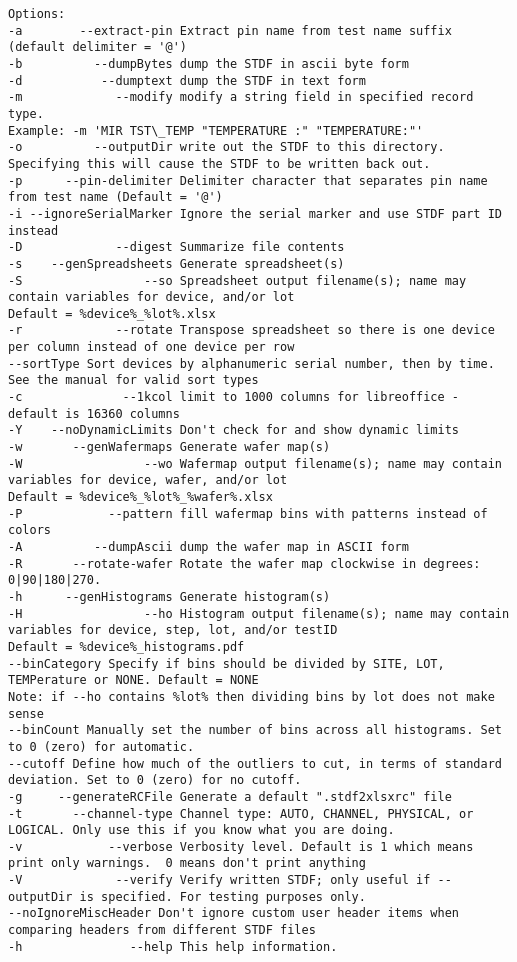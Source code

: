 \documentclass[letterpaper]{article}
\begin{document}
\begin{verbatim}
Options:
-a        --extract-pin Extract pin name from test name suffix (default delimiter = '@')
-b          --dumpBytes dump the STDF in ascii byte form
-d           --dumptext dump the STDF in text form
-m             --modify modify a string field in specified record type.
Example: -m 'MIR TST\_TEMP "TEMPERATURE :" "TEMPERATURE:"'
-o          --outputDir write out the STDF to this directory. Specifying this will cause the STDF to be written back out.
-p      --pin-delimiter Delimiter character that separates pin name from test name (Default = '@')
-i --ignoreSerialMarker Ignore the serial marker and use STDF part ID instead
-D             --digest Summarize file contents
-s    --genSpreadsheets Generate spreadsheet(s)
-S                 --so Spreadsheet output filename(s); name may contain variables for device, and/or lot
Default = %device%_%lot%.xlsx
-r             --rotate Transpose spreadsheet so there is one device per column instead of one device per row
--sortType Sort devices by alphanumeric serial number, then by time. See the manual for valid sort types
-c              --1kcol limit to 1000 columns for libreoffice - default is 16360 columns
-Y    --noDynamicLimits Don't check for and show dynamic limits
-w       --genWafermaps Generate wafer map(s)
-W                 --wo Wafermap output filename(s); name may contain variables for device, wafer, and/or lot
Default = %device%_%lot%_%wafer%.xlsx
-P            --pattern fill wafermap bins with patterns instead of colors
-A          --dumpAscii dump the wafer map in ASCII form
-R       --rotate-wafer Rotate the wafer map clockwise in degrees: 0|90|180|270.
-h      --genHistograms Generate histogram(s)
-H                 --ho Histogram output filename(s); name may contain variables for device, step, lot, and/or testID
Default = %device%_histograms.pdf
--binCategory Specify if bins should be divided by SITE, LOT, TEMPerature or NONE. Default = NONE
Note: if --ho contains %lot% then dividing bins by lot does not make sense
--binCount Manually set the number of bins across all histograms. Set to 0 (zero) for automatic.
--cutoff Define how much of the outliers to cut, in terms of standard deviation. Set to 0 (zero) for no cutoff.
-g     --generateRCFile Generate a default ".stdf2xlsxrc" file
-t       --channel-type Channel type: AUTO, CHANNEL, PHYSICAL, or LOGICAL. Only use this if you know what you are doing.
-v            --verbose Verbosity level. Default is 1 which means print only warnings.  0 means don't print anything
-V             --verify Verify written STDF; only useful if --outputDir is specified. For testing purposes only.
--noIgnoreMiscHeader Don't ignore custom user header items when comparing headers from different STDF files
-h               --help This help information.
\end{verbatim}
\endgroup
\end{document}
